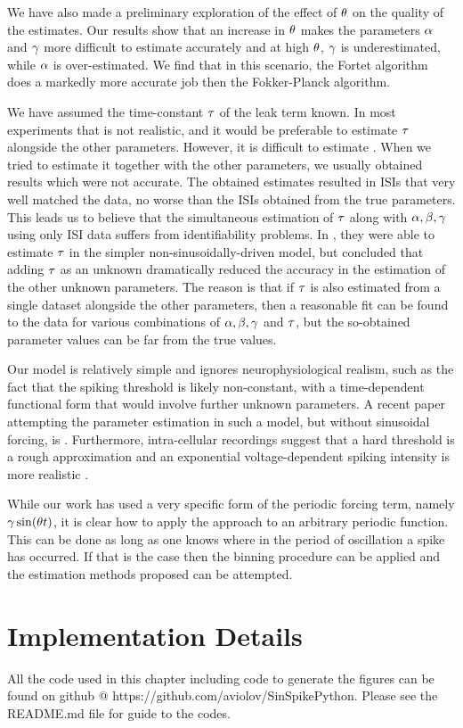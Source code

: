 We have also made a preliminary exploration of the effect of ${ \theta}$ on the
quality of the estimates. Our results show that an increase in ${ \theta}$ makes the
parameters $\alpha$ and ${\gamma }$ more difficult to estimate accurately and at high
${ \theta}$, ${\gamma }$ is underestimated, while $\alpha$ is over-estimated. We find that in
this scenario, the Fortet algorithm does a markedly more accurate job then the
Fokker-Planck algorithm.
 
We have assumed  the time-constant ${\tau}$ of the leak term known. In most
experiments that is not realistic, and it would be preferable to estimate ${\tau}$
alongside the other parameters. However, it is difficult to estimate
\cite{DitlevsenLansky212}. When we tried to estimate it together with the other
parameters, we usually obtained results which were not accurate. The obtained
estimates resulted in ISIs that very well matched the data, no worse than the
ISIs obtained from the true parameters. This leads us to believe that the
simultaneous estimation of ${\tau}$ along with ${\alpha,\beta,{\gamma } }$ using only ISI data suffers
from identifiability problems. In \cite{MullowneyIyengar2008}, they were able to
estimate ${\tau}$ in the simpler non-sinusoidally-driven model, but concluded that
adding ${\tau}$ as an unknown dramatically reduced the accuracy in the estimation of
the other unknown parameters. The reason is that if ${\tau}$ is also estimated from
a single dataset alongside the other parameters, then a reasonable fit can be
found to the data for various combinations of ${\alpha,\beta,{\gamma } }$ and ${\tau}$, but the so-obtained
parameter values can be far from the true values.

Our model is relatively simple and ignores neurophysiological realism, such as
the fact that the spiking threshold is likely non-constant, with a
time-dependent functional form that would involve further unknown parameters. A
recent paper attempting the parameter estimation in such a model, but without
sinusoidal forcing, is \cite{Dong2011}. Furthermore, intra-cellular recordings
suggest that a hard threshold is a rough approximation and an exponential
voltage-dependent spiking intensity is more realistic \cite{Jahn2011}.

While our work has used a very specific form of the periodic forcing term,
namely ${\gamma } \sin({ \theta} t)$,  it is clear how to apply the approach to an arbitrary
periodic function. This can be done as long as one knows where in the period of
oscillation a spike has occurred. If that is the case then the binning procedure
can be applied and the estimation methods proposed can be attempted. 


\section*{Implementation Details}
All the code used in this chapter including code to generate the figures
can be found on
{github @
https://github.com/aviolov/SinSpikePython}. Please see the README.md file for
guide to the codes.
